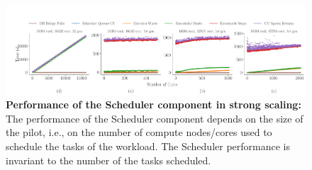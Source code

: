 \documentclass{article}
\begin{document}
\begin{figure}
  \centering
  \includegraphics[width=\textwidth]{figures/paper_titan_rp_synapse_strong_scaling_events_timeline_1stgen_horizontal.pdf}
  \caption{\textbf{Performance of the Scheduler component in strong scaling:}
	The performance of the Scheduler component depends on the size of the
	pilot, i.e., on the number of compute nodes/cores used to schedule the
	tasks of the workload. The Scheduler performance is invariant to the
	number of the tasks scheduled. }\label{fig:ss-events-1stgen}
\end{figure}
\end{document}
